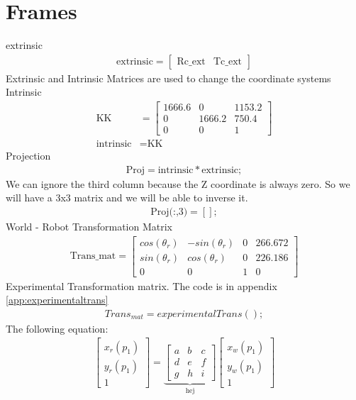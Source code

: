 \chapter{Frames}\label{ch:frames}
extrinsic
\begin{align}
\text{extrinsic} = 
\begin{bmatrix}
    \text{Rc\_ext} & \text{Tc\_ext} 
\end{bmatrix}
\end{align}
Extrinsic and Intrinsic Matrices are used to change the coordinate systems
Intrinsic
\begin{align}
\text{KK} &= 
\begin{bmatrix}
    1666.6 & 0 & 1153.2 \\
    0 & 1666.2 & 750.4 \\
    0 & 0 & 1 
\end{bmatrix} \\
\text{intrinsic} &= \text{KK}
\end{align}
Projection
\begin{align}
\text{Proj} = \text{intrinsic}*\text{extrinsic}; 
\end{align}
We can ignore the third column because the Z coordinate is always zero. So we will have a 3x3 matrix and we will be able to inverse it.
\begin{align}
\text{Proj(:,3)}=[];
\end{align}
World - Robot Transformation Matrix
\begin{align}
\text{Trans\_mat} = 
\begin{bmatrix}
    cos(\theta_r) & -sin(\theta_r) & 0 & 266.672 \\
    sin(\theta_r)  & cos(\theta_r) & 0 & 226.186 \\
        0         &      0         & 1 &    0 
\end{bmatrix}
\end{align}
Experimental Transformation matrix. The code is in appendix \ref{app:experimentaltrans}
\begin{align}
Trans_{mat} = experimentalTrans();
\end{align}
The following equation:
\begin{align*}
\begin{bmatrix}
x_r(p_1) \\
y_r(p_1) \\
1 
\end{bmatrix}
= \underbrace{\begin{bmatrix}
a & b & c \\
d & e & f \\
g & h & i 
\end{bmatrix}}_{\text{hej}}
\begin{bmatrix}
x_w(p_1) \\
y_w(p_1) \\
1 
\end{bmatrix}
\end{align*}
